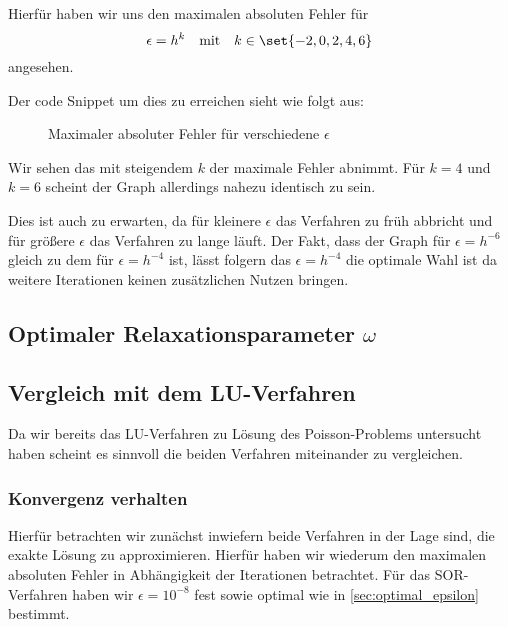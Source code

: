 \documentclass{scrartcl}
\begin{document}
Hierfür haben wir uns den maximalen absoluten Fehler für
\[
    \epsilon = h^k \quad \text{mit} \quad
    k \in \set{-2, 0, 2, 4, 6}
\]
angesehen.

Der code Snippet um dies zu erreichen sieht wie folgt aus:


\begin{figure}[H]
    \centering
    \caption{Maximaler absoluter Fehler für verschiedene \(\epsilon\)}
    \label{fig:optimal_epsilon}
\end{figure}

Wir sehen das mit steigendem \(k\) der maximale Fehler abnimmt. Für \(k = 4\)
und \(k = 6\) scheint der Graph allerdings nahezu identisch zu sein.

Dies ist auch zu erwarten, da für kleinere \(\epsilon\) das Verfahren zu früh
abbricht und für größere \(\epsilon\) das Verfahren zu lange läuft. Der Fakt,
dass der Graph für \(\epsilon = h^{-6}\) gleich zu dem für \(\epsilon =
h^{-4}\) ist, lässt folgern das \(\epsilon = h^{-4}\) die optimale Wahl ist da
weitere Iterationen keinen zusätzlichen Nutzen bringen.

\subsection{Optimaler Relaxationsparameter \(\omega\)}


\subsection{Vergleich mit dem LU-Verfahren}

Da wir bereits das LU-Verfahren zu Lösung des Poisson-Problems untersucht haben
scheint es sinnvoll die beiden Verfahren miteinander zu vergleichen.

\subsubsection{Konvergenz verhalten}

Hierfür betrachten wir zunächst inwiefern beide Verfahren in der Lage sind, die
exakte Lösung zu approximieren. Hierfür haben wir wiederum den maximalen
absoluten Fehler in Abhängigkeit der Iterationen betrachtet. Für das
SOR-Verfahren haben wir \(\epsilon = 10^{-8}\) fest sowie optimal wie in
\autoref{sec:optimal_epsilon} bestimmt.
\end{document}

